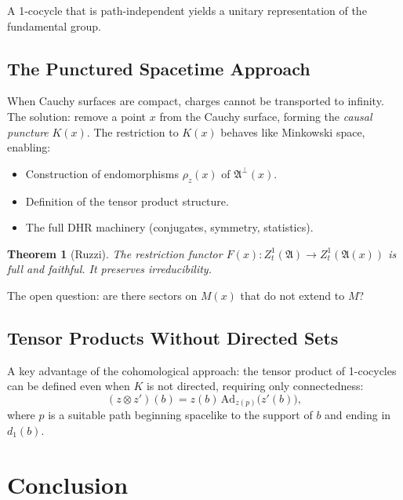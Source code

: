 \documentclass[11pt,a4paper]{article}
\newtheorem{theorem}{Theorem}[section]
\begin{document}
A 1-cocycle that is path-independent yields a unitary representation of
the fundamental group.

\subsection{The Punctured Spacetime Approach}

When Cauchy surfaces are compact, charges cannot be transported to infinity.
The solution: remove a point $x$ from the Cauchy surface, forming the
\emph{causal puncture} $K(x)$. The restriction to $K(x)$ behaves like
Minkowski space, enabling:
\begin{itemize}[nosep]
  \item Construction of endomorphisms $\rho_z(x)$ of $\mathfrak{A}^\perp(x)$.
  \item Definition of the tensor product structure.
  \item The full DHR machinery (conjugates, symmetry, statistics).
\end{itemize}

\begin{theorem}[Ruzzi]
The restriction functor $F(x): Z^1_t(\mathfrak{A}) \to Z^1_t(\mathfrak{A}(x))$
is full and faithful. It preserves irreducibility.
\end{theorem}

The open question: are there sectors on $M(x)$ that do not extend to $M$?

\subsection{Tensor Products Without Directed Sets}

A key advantage of the cohomological approach: the tensor product of
1-cocycles can be defined even when $K$ is not directed, requiring only
connectedness:
\begin{equation}
  (z \otimes z')(b) = z(b)\, \mathrm{Ad}_{z(p)}\bigl(z'(b)\bigr),
\end{equation}
where $p$ is a suitable path beginning spacelike to the support of $b$
and ending in $d_1(b)$.

\section{Conclusion}
\end{document}
